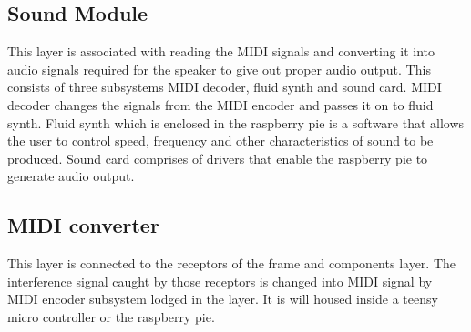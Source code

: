 \subsection{Sound Module}
This layer is associated with reading the MIDI signals and converting it into audio signals required for the speaker to give out proper audio output. This consists of three subsystems MIDI decoder, fluid synth and sound card. MIDI decoder changes the signals from the MIDI encoder and passes it on to fluid synth. Fluid synth which is enclosed in the raspberry pie is a software that allows the user to control speed, frequency and other characteristics of sound to be produced. Sound card comprises of drivers that enable the raspberry pie to generate audio output.

\subsection{MIDI converter}
This layer is connected to the receptors of the frame and components layer. The interference signal caught by those receptors is changed into MIDI signal by MIDI encoder subsystem lodged in the layer. It is will housed inside a teensy micro controller or the raspberry pie.